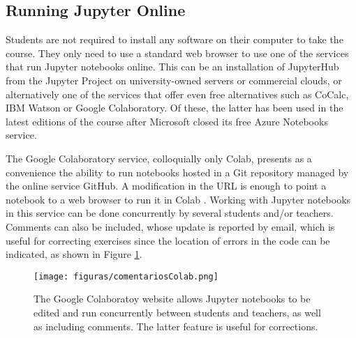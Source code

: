 \subsection{Running Jupyter Online}
Students are not required to install any software on their computer to take the course.
They only need to use a standard web browser to use one of the services that run Jupyter notebooks online.
This can be an installation of JupyterHub from the Jupyter Project on university-owned servers or commercial clouds, or alternatively one of the services that offer even free alternatives such as CoCalc, IBM Watson or Google Colaboratory.
Of these, the latter has been used in the latest editions of the course after Microsoft closed its free Azure Notebooks service.

The Google Colaboratory service, colloquially only Colab, presents as a convenience the ability to run notebooks hosted in a Git repository managed by the online service GitHub.
A modification in the URL is enough to point a notebook to a web browser to run it in Colab \cite{colab}.
Working with Jupyter notebooks in this service can be done concurrently by several students and/or teachers.
Comments can also be included, whose update is reported by email, which is useful for correcting exercises since the location of errors in the code can be indicated, as shown in Figure \ref{fig:colab}.

\begin{figure}[!ht]
	\centering
	\texttt{[image: figuras/comentariosColab.png]}
	\caption{
		The Google Colaboratoy website allows Jupyter notebooks to be edited and run concurrently between students and teachers, as well as including comments.
		The latter feature is useful for corrections.
	}
	\label{fig:colab}
\end{figure}




